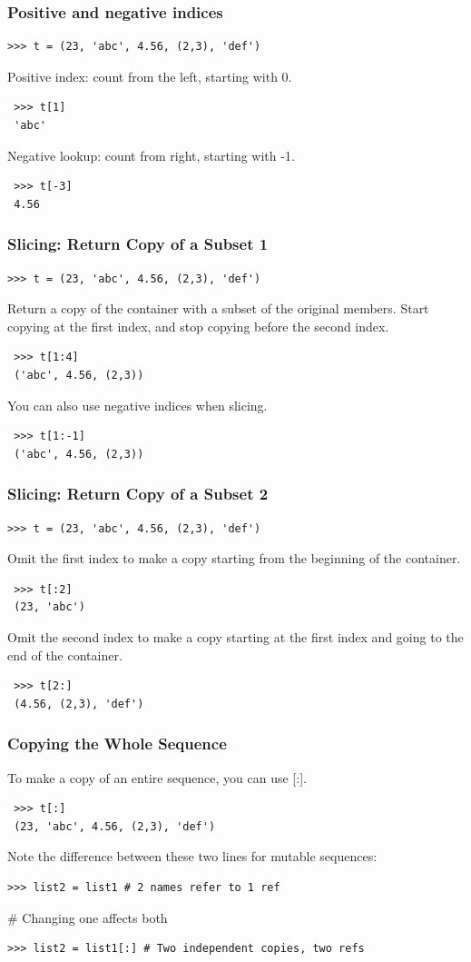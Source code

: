 \documentclass[12pt,handout]{beamer}
\begin{document}
\begin{frame}[fragile]
\frametitle{Positive and negative indices}
\small{
\begin{verbatim}
>>> t = (23, 'abc', 4.56, (2,3), 'def')
\end{verbatim}
}
Positive index: count from the left, starting with 0.
\small{
\begin{verbatim}
 >>> t[1]
 'abc'
\end{verbatim}
}
Negative lookup: count from right, starting with -1.
\small{
\begin{verbatim}
 >>> t[-3]
 4.56
\end{verbatim}
}
\end{frame}


\begin{frame}[fragile]
\frametitle{Slicing: Return Copy of a Subset 1}
\small{
\begin{verbatim}
>>> t = (23, 'abc', 4.56, (2,3), 'def')
\end{verbatim}
}
Return a copy of the container with a subset of the original
members. Start copying at the first index, and stop copying
before the second index.
\small{
\begin{verbatim}
 >>> t[1:4]
 ('abc', 4.56, (2,3))
\end{verbatim}
}
You can also use negative indices when slicing.
\small{
\begin{verbatim}
 >>> t[1:-1]
 ('abc', 4.56, (2,3))
\end{verbatim}
}
\end{frame}


\begin{frame}[fragile]
\frametitle{Slicing: Return Copy of a Subset 2}
\small{
\begin{verbatim}
>>> t = (23, 'abc', 4.56, (2,3), 'def')
\end{verbatim}
}
Omit the first index to make a copy starting from the beginning
of the container.
\small{
\begin{verbatim}
 >>> t[:2]
 (23, 'abc')
\end{verbatim}
}
Omit the second index to make a copy starting at the first index
and going to the end of the container.
\small{
\begin{verbatim}
 >>> t[2:]
 (4.56, (2,3), 'def')
\end{verbatim}
}
\end{frame}


\begin{frame}[fragile]
\frametitle{Copying the Whole Sequence}
To make a copy of an entire sequence, you can use [:].
\small{
\begin{verbatim}
 >>> t[:]
 (23, 'abc', 4.56, (2,3), 'def')
\end{verbatim}
}
Note the difference between these two lines for mutable
sequences:
\small{
\begin{verbatim}
>>> list2 = list1 # 2 names refer to 1 ref
\end{verbatim}
}
\# Changing one affects both
\small{
\begin{verbatim}
>>> list2 = list1[:] # Two independent copies, two refs
\end{verbatim}
}
\end{frame}
\end{document}
